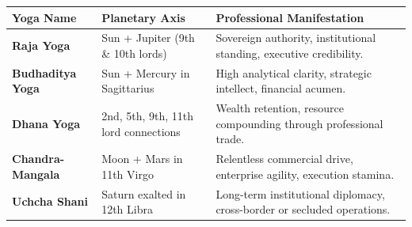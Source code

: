 
\begin{executivecard}
  \sffamily\fontsize{8}{11.5}\selectfont
  \begin{tabularx}{\linewidth}{@{}l l X@{}}
    \toprule
    \textbf{Yoga Name} & \textbf{Planetary Axis} & \textbf{Professional Manifestation} \\
    \midrule
    \textbf{Raja Yoga} & Sun + Jupiter (9th \& 10th lords) & Sovereign authority, institutional standing, executive credibility. \\
    \textbf{Budhaditya Yoga} & Sun + Mercury in Sagittarius & High analytical clarity, strategic intellect, financial acumen. \\
    \textbf{Dhana Yoga} & 2nd, 5th, 9th, 11th lord connections & Wealth retention, resource compounding through professional trade. \\
    \textbf{Chandra-Mangala} & Moon + Mars in 11th Virgo & Relentless commercial drive, enterprise agility, execution stamina. \\
    \textbf{Uchcha Shani} & Saturn exalted in 12th Libra & Long-term institutional diplomacy, cross-border or secluded operations. \\
    \bottomrule
  \end{tabularx}
\end{executivecard}\vspace{2mm}

